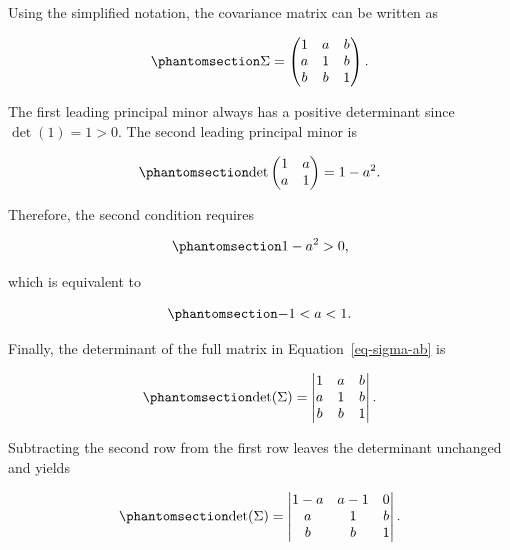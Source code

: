 \documentclass[
  12pt,
]{article}
\begin{document}
Using the simplified notation, the covariance matrix can be written as

\begin{equation}\protect\phantomsection\label{eq-sigma-ab}{
\Sigma =
\begin{pmatrix}
1 & a & b \\
a & 1 & b \\
b & b & 1
\end{pmatrix}.
}\end{equation}

The first leading principal minor always has a positive determinant
since \(\det(1) = 1 > 0\). The second leading principal minor is

\begin{equation}\protect\phantomsection\label{eq-second-principal-minor}{
\det
\begin{pmatrix}
1 & a \\
a & 1
\end{pmatrix}
=
1-a^2.
}\end{equation}

Therefore, the second condition requires

\begin{equation}\protect\phantomsection\label{eq-second-principal-minor-condition}{
1-a^2 > 0,
}\end{equation}

which is equivalent to

\begin{equation}\protect\phantomsection\label{eq-a-range}{
-1 < a < 1.
}\end{equation}

Finally, the determinant of the full matrix in
Equation~\ref{eq-sigma-ab} is

\begin{equation}\protect\phantomsection\label{eq-full-determinant-start}{
\det(\Sigma)
=
\begin{vmatrix}
1 & a & b \\
a & 1 & b \\
b & b & 1
\end{vmatrix}.
}\end{equation}

Subtracting the second row from the first row leaves the determinant
unchanged and yields

\begin{equation}\protect\phantomsection\label{eq-full-determinant-row-operation}{
\det(\Sigma)
=
\begin{vmatrix}
1-a & a-1 & 0 \\
a & 1 & b \\
b & b & 1
\end{vmatrix}.
}\end{equation}
\end{document}
